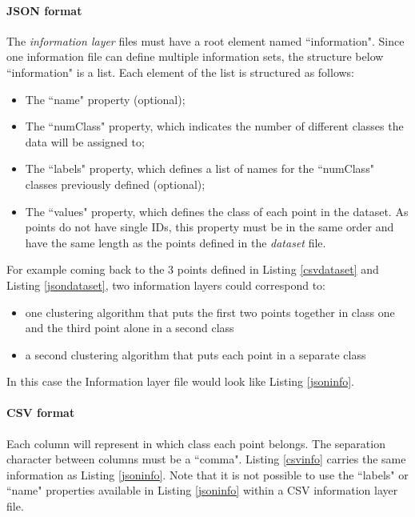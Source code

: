 		\paragraph{JSON format}
The {\it{information layer}} files must have a root element named  ``information". Since one information file can define multiple information sets, the structure below ``information" is a list. Each element of the list is structured as follows:
\begin{itemize}
\item{The ``name" property (optional);}
\item{The ``numClass" property, which indicates the number of different classes the data will be assigned to;}
\item{The ``labels" property, which defines a list of names for the ``numClass" classes previously defined (optional);}
\item{The ``values" property, which defines the class of each point in the dataset. As points do not have single IDs, this property must be in the same order and have the same length as the points defined in the {\it{dataset}} file.}
\end{itemize}

For example coming back to the 3 points defined in Listing \ref{csvdataset} and Listing \ref{jsondataset}, two information layers could correspond to: 
\begin{itemize}

\item{one clustering algorithm that puts the first two points together in class one and the third point alone in a second class}
\item{a second clustering algorithm that puts each point in a separate class}
\end{itemize}

In this case the Information layer file would look like Listing \ref{jsoninfo}.


		\paragraph{CSV format}
Each column will represent in which class each point belongs. The separation character between columns must be a ``comma". Listing \ref{csvinfo} carries the same information as Listing \ref{jsoninfo}. Note that it is not possible to use the ``labels" or ``name" properties available in Listing \ref{jsoninfo} within a CSV information layer file. 




